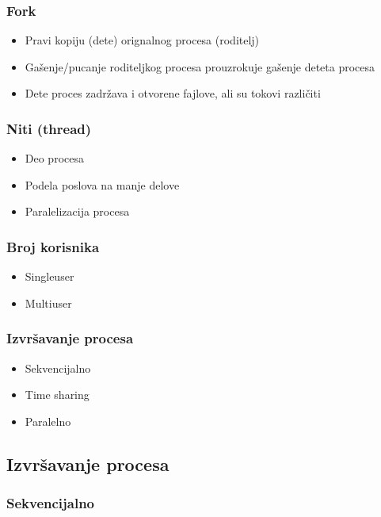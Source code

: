 \documentclass{beamer}
\begin{document}
\begin{frame}
    \frametitle{Fork}
    \begin{itemize}
        \item Pravi kopiju (dete) orignalnog procesa (roditelj) \newline
        \item Gašenje/pucanje roditeljkog procesa prouzrokuje gašenje deteta procesa \newline
        \item Dete proces zadržava i otvorene fajlove, ali su tokovi različiti
    \end{itemize}
\end{frame}

\begin{frame}
    \frametitle{Niti (thread)}
    \begin{itemize}
        \item Deo procesa \newline
        \item Podela poslova na manje delove \newline
        \item Paralelizacija procesa 
    \end{itemize}
\end{frame}

\begin{frame}
    \frametitle{Broj korisnika}
    \begin{itemize}
        \item Singleuser \newline
        \item Multiuser
    \end{itemize}
\end{frame}

\begin{frame}
    \frametitle{Izvršavanje procesa}
    \begin{itemize}
        \item Sekvencijalno \newline
        \item Time sharing \newline
        \item Paralelno
    \end{itemize}
\end{frame}

\subsection*{Izvršavanje procesa}
\begin{frame}
    \frametitle{Sekvencijalno}
    \begin{center}
    \end{center}
\end{frame}
\end{document}
